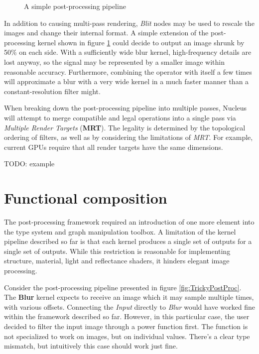 \begin{figure}[h!]
  \centering
    \caption[Simple post-processing]{A simple post-processing pipeline}
  \label{fig:SimplePostProc}
\end{figure}

In addition to causing multi-pass rendering, \emph{Blit} nodes may be used to rescale the images and change their internal format. A simple extension of the post-processing kernel shown in figure \ref{fig:SimplePostProc} could decide to output an image shrunk by 50\% on each side. With a sufficiently wide blur kernel, high-frequency details are lost anyway, so the signal may be represented by a smaller image within reasonable accuracy. Furthermore, combining the operator with itself a few times will approximate a blur with a very wide kernel in a much faster manner than a constant-resolution filter might.

When breaking down the post-processing pipeline into multiple passes, Nucleus will attempt to merge compatible and legal operations into a single pass via \emph{Multiple Render Targets} (\textbf{MRT}). The legality is determined by the topological ordering of filters, as well as by considering the limitations of \emph{MRT}. For example, current GPUs require that all render targets have the same dimensions.

TODO: example


\section{Functional composition}
\label{sec:FunctionalComposition}

The post-processing framework required an introduction of one more element into the type system and graph manipulation toolbox. A limitation of the kernel pipeline described so far is that each kernel produces a single set of outputs for a single set of outputs. While this restriction is reasonable for implementing structure, material, light and reflectance shaders, it hinders elegant image processing.

Consider the post-processing pipeline presented in figure \ref{fig:TrickyPostProc}. The \textbf{Blur} kernel expects to receive an image which it may sample multiple times, with various offsets. Connecting the \emph{Input} directly to \emph{Blur} would have worked fine within the framework described so far. However, in this particular case, the user decided to filter the input image through a power function first. The function is not specialized to work on images, but on individual values. There's a clear type mismatch, but intuitively this case should work just fine.

